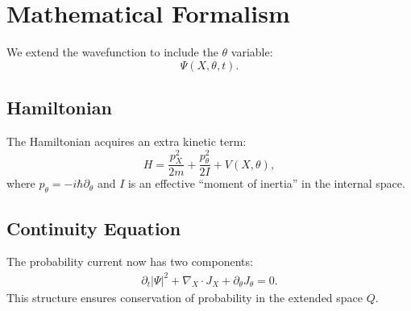 \section{Mathematical Formalism}

We extend the wavefunction to include the $\theta$ variable:
\begin{equation}
\Psi(X, \theta, t).
\end{equation}

\subsection{Hamiltonian}
The Hamiltonian acquires an extra kinetic term:
\begin{equation}
H = \frac{p_X^2}{2m} + \frac{p_\theta^2}{2I} + V(X,\theta),
\end{equation}
where $p_\theta = -i\hbar \partial_\theta$ and $I$ is an effective ``moment
of inertia'' in the internal space.

\subsection{Continuity Equation}
The probability current now has two components:
\begin{align}
\partial_t |\Psi|^2 + \nabla_X \cdot J_X + \partial_\theta J_\theta = 0.
\end{align}
This structure ensures conservation of probability in the extended space $Q$.
